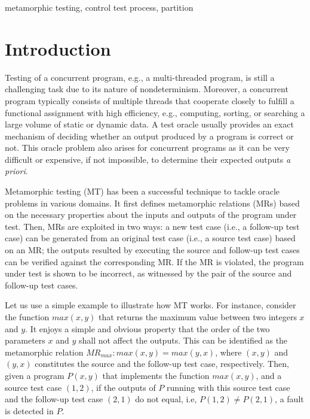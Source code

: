 \documentclass[conference]{IEEEtran}
\theoremstyle{remark}
\newcommand{\MR}{\textit{MR}}
\begin{document}
\begin{IEEEkeywords}
metamorphic testing, control test process, partition
\end{IEEEkeywords}

\section{Introduction}
\label{section:introduction}
Testing of a concurrent program, e.g., a multi-threaded program, is still a challenging task due to its nature of nondeterminism. Moreover, a concurrent program typically consists of multiple threads that cooperate closely to fulfill a functional assignment with high efficiency, e.g., computing, sorting, or searching a large volume of static or dynamic data. A test oracle \cite{weyuker1982testing} usually provides an exact mechanism of deciding whether an output
produced by a program is correct or not. This oracle problem \cite{barr2015oracle, patel2018mapping} also arises for concurrent programs as it can be very difficult or expensive, if not impossible, to determine their expected outputs \textit{a priori}.

Metamorphic testing (MT) \cite{chen1998metamorphic, chen2018metamorphic} has been a successful technique to tackle oracle problems in various domains. It first defines metamorphic relations (MRs)
based on the necessary properties about the inputs and outputs of the program under test. Then, MRs are exploited in two ways: a new test case (i.e., a follow-up test case) can be generated from an original test case (i.e., a source test case) based on an MR; the outputs resulted by executing the source and follow-up test cases can be verified against the corresponding MR. If the MR is violated, the program under test is shown to be incorrect, as witnessed by the pair of the source and follow-up test cases.

Let us use a simple example to illustrate how MT works. For instance, consider the function $max(x,y)$ that returns the maximum value between two integers $x$ and $y$. It enjoys a simple and obvious property that the order of the two parameters $x$ and $y$ shall not affect the outputs. This can be identified as the metamorphic relation $\MR_{max}: max(x,y) = max(y,x)$, where $(x,y)$ and $(y,x)$ constitutes the source and the follow-up test case, respectively. Then, given a program $P(x,y)$ that implements the function $max(x,y)$, and a source test case $(1,2)$, if the outputs of $P$ running with this source test case and the follow-up test case $(2,1)$ do not equal, i.e, $P(1,2)\neq P(2,1)$, a fault is detected in $P$.
\end{document}
